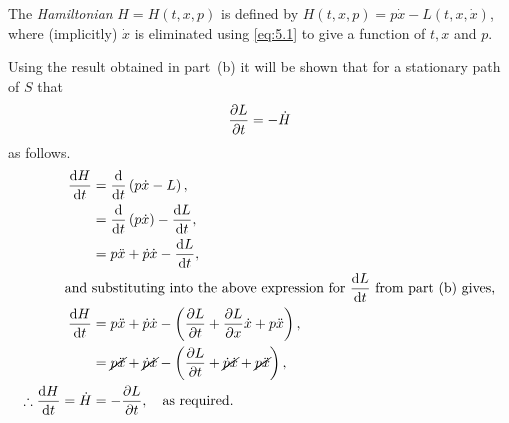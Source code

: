 The \textit{Hamiltonian} $H=H(t,x,p)$ is defined by $H(t,x,p) = p\dot{x} - L(t,x,\dot{x})$, where (implicitly) $\dot{x}$ is eliminated using \eqref{eq:5.1} to give a function of $t,x$ and $p$.

Using the result obtained in part~(b) it will be shown that for a stationary path of $S$ that
\begin{equation}
	\frac{\partial L}{\partial t} = -\dot{H}
\end{equation}
as follows.
\begin{align*}
	\frac{\mathrm{d}H}{\mathrm{d}t} &= \frac{\mathrm{d}}{\mathrm{d}t}\left(p\dot{x} - L\right),\\
	&= \frac{\mathrm{d}}{\mathrm{d}t}\left(p\dot{x}\right) -\frac{\mathrm{d}L}{\mathrm{d}t},\\
	&= p\ddot{x} + \dot{p}\dot{x} -\frac{\mathrm{d}L}{\mathrm{d}t},\\
	\text{and }&\text{substituting into the above expression for } \frac{\mathrm{d}L}{\mathrm{d}t} \text{ from part~(b) gives,}\\
	\frac{\mathrm{d}H}{\mathrm{d}t} &= p\ddot{x} + \dot{p}\dot{x} - \left(\frac{\partial L}{\partial t} + \frac{\partial L}{\partial x}\dot{x} + p\ddot{x}\right),\\
	&= \cancel{p\ddot{x}} + \cancel{\dot{p}\dot{x}} - \left(\frac{\partial L}{\partial t} + \cancel{\dot{p}\dot{x}} + \cancel{p\ddot{x}}\right),\\
	\therefore \frac{\mathrm{d}H}{\mathrm{d}t} =\dot{H} &= -\frac{\partial L}{\partial t},\quad\text{as required.}\quad
\end{align*}

